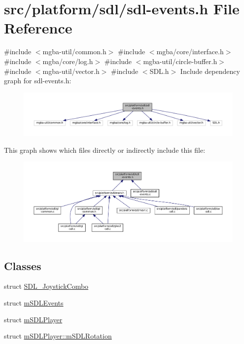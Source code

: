 \hypertarget{sdl-events_8h}{}\section{src/platform/sdl/sdl-\/events.h File Reference}
\label{sdl-events_8h}
{\ttfamily \#include $<$mgba-\/util/common.\+h$>$}\newline
{\ttfamily \#include $<$mgba/core/interface.\+h$>$}\newline
{\ttfamily \#include $<$mgba/core/log.\+h$>$}\newline
{\ttfamily \#include $<$mgba-\/util/circle-\/buffer.\+h$>$}\newline
{\ttfamily \#include $<$mgba-\/util/vector.\+h$>$}\newline
{\ttfamily \#include $<$S\+D\+L.\+h$>$}\newline
Include dependency graph for sdl-\/events.h\+:
\nopagebreak
\begin{figure}[H]
\begin{center}
\leavevmode
\includegraphics[width=350pt]{sdl-events_8h__incl}
\end{center}
\end{figure}
This graph shows which files directly or indirectly include this file\+:
\nopagebreak
\begin{figure}[H]
\begin{center}
\leavevmode
\includegraphics[width=350pt]{sdl-events_8h__dep__incl}
\end{center}
\end{figure}
\subsection*{Classes}
\begin{DoxyCompactItemize}
\item 
struct \mbox{\hyperlink{sdl-events_8h_struct_s_d_l___joystick_combo}{S\+D\+L\+\_\+\+Joystick\+Combo}}
\item 
struct \mbox{\hyperlink{sdl-events_8h_structm_s_d_l_events}{m\+S\+D\+L\+Events}}
\item 
struct \mbox{\hyperlink{sdl-events_8h_structm_s_d_l_player}{m\+S\+D\+L\+Player}}
\item 
struct \mbox{\hyperlink{sdl-events_8h_structm_s_d_l_player_1_1m_s_d_l_rotation}{m\+S\+D\+L\+Player\+::m\+S\+D\+L\+Rotation}}
\end{DoxyCompactItemize}
